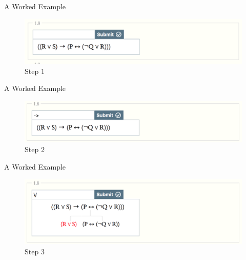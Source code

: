 \documentclass[
  ignorenonframetext,
]{beamer}
\renewcommand{\,}{\text{, }}
\begin{document}
\begin{frame}{A Worked Example}
\protect\hypertarget{a-worked-example}{}

\begin{figure}
\centering
\includegraphics{../images/class02/1.png}
\caption{Step 1}
\end{figure}

\end{frame}

\begin{frame}{A Worked Example}
\protect\hypertarget{a-worked-example-1}{}

\begin{figure}
\centering
\includegraphics{../images/class02/2.png}
\caption{Step 2}
\end{figure}

\end{frame}

\begin{frame}{A Worked Example}
\protect\hypertarget{a-worked-example-2}{}

\begin{figure}
\centering
\includegraphics{../images/class02/3.png}
\caption{Step 3}
\end{figure}

\end{frame}
\end{document}
